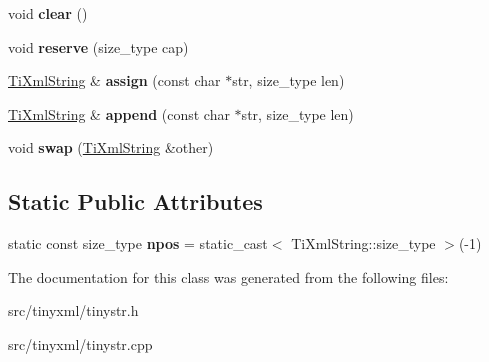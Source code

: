 \begin{DoxyCompactItemize}
\item 
void {\bfseries clear} ()\hypertarget{classTiXmlString_ab20e06e4c666abf3bdbfb3a1191d4888}{}\label{classTiXmlString_ab20e06e4c666abf3bdbfb3a1191d4888}

\item 
void {\bfseries reserve} (size\+\_\+type cap)\hypertarget{classTiXmlString_a88ecf9f0f00cb5c67b6b637958d7049c}{}\label{classTiXmlString_a88ecf9f0f00cb5c67b6b637958d7049c}

\item 
\hyperlink{classTiXmlString}{Ti\+Xml\+String} \& {\bfseries assign} (const char $\ast$str, size\+\_\+type len)\hypertarget{classTiXmlString_ac72f3d9149b7812c1e6c59402014d0d5}{}\label{classTiXmlString_ac72f3d9149b7812c1e6c59402014d0d5}

\item 
\hyperlink{classTiXmlString}{Ti\+Xml\+String} \& {\bfseries append} (const char $\ast$str, size\+\_\+type len)\hypertarget{classTiXmlString_ad44b21700d2ec24a511367b222b643fb}{}\label{classTiXmlString_ad44b21700d2ec24a511367b222b643fb}

\item 
void {\bfseries swap} (\hyperlink{classTiXmlString}{Ti\+Xml\+String} \&other)\hypertarget{classTiXmlString_aa392cbc180752a79f007f4f9280c7762}{}\label{classTiXmlString_aa392cbc180752a79f007f4f9280c7762}

\end{DoxyCompactItemize}
\subsection*{Static Public Attributes}
\begin{DoxyCompactItemize}
\item 
static const size\+\_\+type {\bfseries npos} = static\+\_\+cast$<$ Ti\+Xml\+String\+::size\+\_\+type $>$(-\/1)\hypertarget{classTiXmlString_a8f4422d227088dc7bec96f479b275d0a}{}\label{classTiXmlString_a8f4422d227088dc7bec96f479b275d0a}

\end{DoxyCompactItemize}


The documentation for this class was generated from the following files\+:\begin{DoxyCompactItemize}
\item 
src/tinyxml/tinystr.\+h\item 
src/tinyxml/tinystr.\+cpp\end{DoxyCompactItemize}
